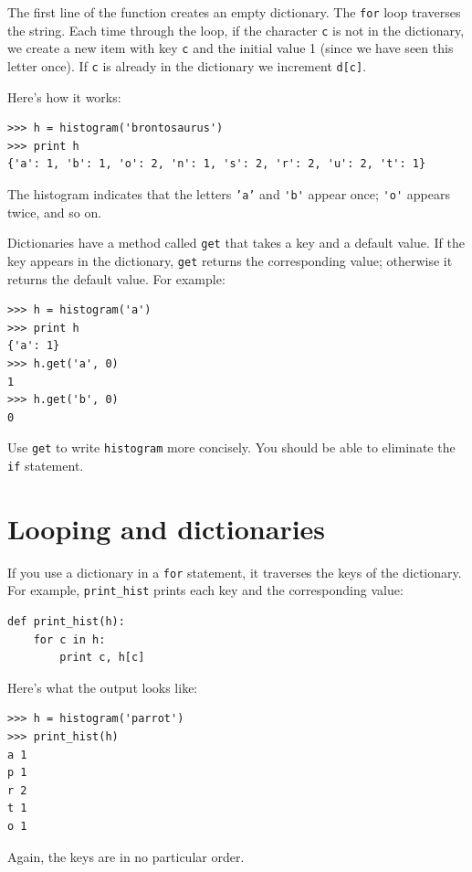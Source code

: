 \documentclass[10pt]{book}
\begin{document}
The first line of the
function creates an empty dictionary.  The {\tt for} loop traverses
the string.  Each time through the loop, if the character {\tt c} is
not in the dictionary, we create a new item with key {\tt c} and the
initial value 1 (since we have seen this letter once).  If {\tt c} is
already in the dictionary we increment {\tt d[c]}.

Here's how it works:

\begin{verbatim}
>>> h = histogram('brontosaurus')
>>> print h
{'a': 1, 'b': 1, 'o': 2, 'n': 1, 's': 2, 'r': 2, 'u': 2, 't': 1}
\end{verbatim}
%
The histogram indicates that the letters {\tt 'a'} and \verb"'b'"
appear once; \verb"'o'" appears twice, and so on.

\begin{exercise}

Dictionaries have a method called {\tt get} that takes a key
and a default value.  If the key appears in the dictionary,
{\tt get} returns the corresponding value; otherwise it returns
the default value.  For example:

\begin{verbatim}
>>> h = histogram('a')
>>> print h
{'a': 1}
>>> h.get('a', 0)
1
>>> h.get('b', 0)
0
\end{verbatim}
%
Use {\tt get} to write {\tt histogram} more concisely.  You
should be able to eliminate the {\tt if} statement.
\end{exercise}


\section{Looping and dictionaries}

If you use a dictionary in a {\tt for} statement, it traverses
the keys of the dictionary.  For example, \verb"print_hist"
prints each key and the corresponding value:

\begin{verbatim}
def print_hist(h):
    for c in h:
        print c, h[c]
\end{verbatim}
%
Here's what the output looks like:

\begin{verbatim}
>>> h = histogram('parrot')
>>> print_hist(h)
a 1
p 1
r 2
t 1
o 1
\end{verbatim}
%
Again, the keys are in no particular order.
\end{document}
